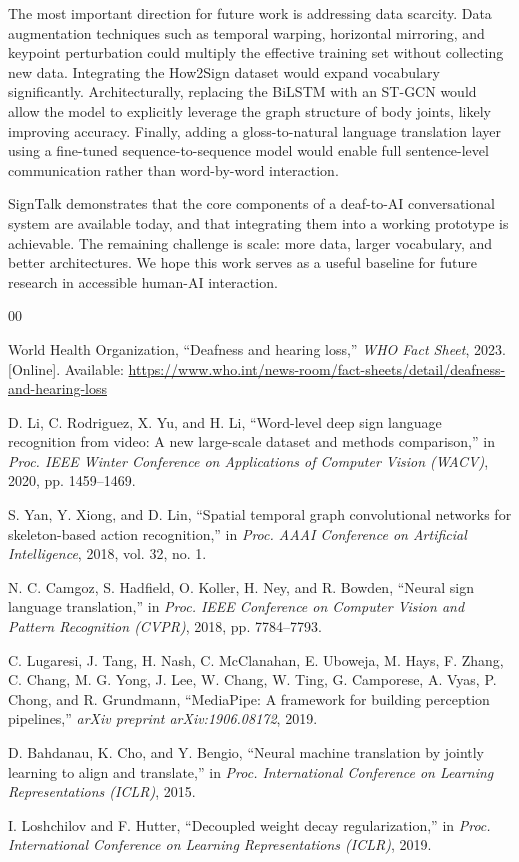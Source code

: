 \documentclass[conference]{IEEEtran}
\begin{document}
The most important direction for future work is addressing data scarcity. Data augmentation techniques such as temporal warping, horizontal mirroring, and keypoint perturbation could multiply the effective training set without collecting new data. Integrating the How2Sign dataset would expand vocabulary significantly. Architecturally, replacing the BiLSTM with an ST-GCN \cite{yan2018stgcn} would allow the model to explicitly leverage the graph structure of body joints, likely improving accuracy. Finally, adding a gloss-to-natural language translation layer using a fine-tuned sequence-to-sequence model \cite{camgoz2018slr} would enable full sentence-level communication rather than word-by-word interaction.

SignTalk demonstrates that the core components of a deaf-to-AI conversational system are available today, and that integrating them into a working prototype is achievable. The remaining challenge is scale: more data, larger vocabulary, and better architectures. We hope this work serves as a useful baseline for future research in accessible human-AI interaction.

\begin{thebibliography}{00}

World Health Organization, ``Deafness and hearing loss,'' \textit{WHO Fact Sheet}, 2023. [Online]. Available: \url{https://www.who.int/news-room/fact-sheets/detail/deafness-and-hearing-loss}

D. Li, C. Rodriguez, X. Yu, and H. Li, ``Word-level deep sign language recognition from video: A new large-scale dataset and methods comparison,'' in \textit{Proc. IEEE Winter Conference on Applications of Computer Vision (WACV)}, 2020, pp. 1459--1469.

S. Yan, Y. Xiong, and D. Lin, ``Spatial temporal graph convolutional networks for skeleton-based action recognition,'' in \textit{Proc. AAAI Conference on Artificial Intelligence}, 2018, vol. 32, no. 1.

N. C. Camgoz, S. Hadfield, O. Koller, H. Ney, and R. Bowden, ``Neural sign language translation,'' in \textit{Proc. IEEE Conference on Computer Vision and Pattern Recognition (CVPR)}, 2018, pp. 7784--7793.

C. Lugaresi, J. Tang, H. Nash, C. McClanahan, E. Uboweja, M. Hays, F. Zhang, C. Chang, M. G. Yong, J. Lee, W. Chang, W. Ting, G. Camporese, A. Vyas, P. Chong, and R. Grundmann, ``MediaPipe: A framework for building perception pipelines,'' \textit{arXiv preprint arXiv:1906.08172}, 2019.

D. Bahdanau, K. Cho, and Y. Bengio, ``Neural machine translation by jointly learning to align and translate,'' in \textit{Proc. International Conference on Learning Representations (ICLR)}, 2015.

I. Loshchilov and F. Hutter, ``Decoupled weight decay regularization,'' in \textit{Proc. International Conference on Learning Representations (ICLR)}, 2019.

\end{thebibliography}
\end{document}
